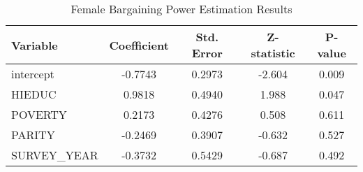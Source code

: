 \begin{table}[htbp]
\centering
\caption{Female Bargaining Power Estimation Results}
\label{tab:bargaining_results}
\begin{tabular}{lcccc}
\hline
Variable & Coefficient & Std. Error & Z-statistic & P-value \\
\hline
intercept & -0.7743 & 0.2973 & -2.604 & 0.009 \\
HIEDUC & 0.9818 & 0.4940 & 1.988 & 0.047 \\
POVERTY & 0.2173 & 0.4276 & 0.508 & 0.611 \\
PARITY & -0.2469 & 0.3907 & -0.632 & 0.527 \\
SURVEY\_YEAR & -0.3732 & 0.5429 & -0.687 & 0.492 \\
\hline
\end{tabular}
\end{table}